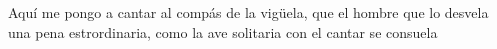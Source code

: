 
\begin{dedication}
    Aquí me pongo a cantar
    al compás de la vigüela,
    que el hombre que lo desvela
    una pena estrordinaria,
    como la ave solitaria
    con el cantar se consuela
\end{dedication}